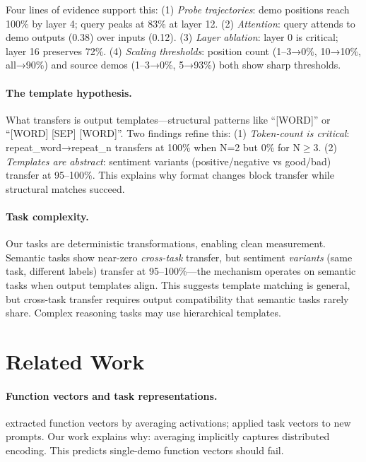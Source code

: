 \documentclass[11pt]{article}
\begin{document}
Four lines of evidence support this: (1) \emph{Probe trajectories}: demo positions reach 100\% by layer 4; query peaks at 83\% at layer 12. (2) \emph{Attention}: query attends to demo outputs (0.38) over inputs (0.12). (3) \emph{Layer ablation}: layer 0 is critical; layer 16 preserves 72\%. (4) \emph{Scaling thresholds}: position count (1--3→0\%, 10→10\%, all→90\%) and source demos (1--3→0\%, 5→93\%) both show sharp thresholds.

\paragraph{The template hypothesis.}
What transfers is output templates---structural patterns like ``[WORD]'' or ``[WORD] [SEP] [WORD]''. Two findings refine this: (1) \emph{Token-count is critical}: repeat\_word→repeat\_n transfers at 100\% when N=2 but 0\% for N$\geq$3. (2) \emph{Templates are abstract}: sentiment variants (positive/negative vs good/bad) transfer at 95--100\%. This explains why format changes block transfer while structural matches succeed.

\paragraph{Task complexity.}
Our tasks are deterministic transformations, enabling clean measurement. Semantic tasks show near-zero \emph{cross-task} transfer, but sentiment \emph{variants} (same task, different labels) transfer at 95--100\%---the mechanism operates on semantic tasks when output templates align. This suggests template matching is general, but cross-task transfer requires output compatibility that semantic tasks rarely share. Complex reasoning tasks \citep{wei2022chain} may use hierarchical templates.

\section{Related Work}
\label{sec:related}

\paragraph{Function vectors and task representations.}
\citet{todd2023function} extracted function vectors by averaging activations; \citet{hendel2023context} applied task vectors to new prompts. Our work explains why: averaging implicitly captures distributed encoding. This predicts single-demo function vectors should fail.
\end{document}
